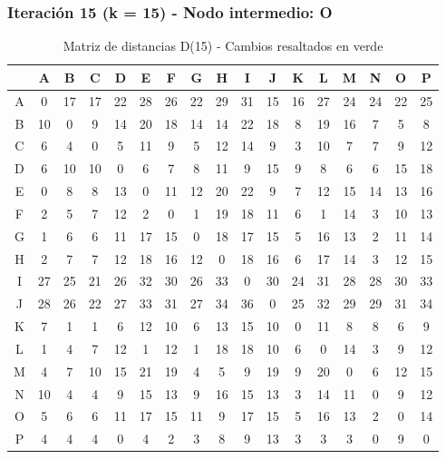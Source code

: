 \documentclass[12pt]{article}
\begin{document}
\subsubsection{Iteración 15 (k = 15) - Nodo intermedio: O}
\begin{table}[h!]
\centering
\begin{tabular}{|c|c|c|c|c|c|c|c|c|c|c|c|c|c|c|c|c|}
\hline
 & A & B & C & D & E & F & G & H & I & J & K & L & M & N & O & P \\\hline
A & 0 & 17 & 17 & 22 & 28 & 26 & 22 & 29 & 31 & 15 & 16 & 27 & 24 & 24 & 22 & 25 \\\hline
B & \cellcolor{lightgreen} 10 & 0 & 9 & 14 & 20 & 18 & 14 & \cellcolor{lightgreen} 14 & \cellcolor{lightgreen} 22 & 18 & 8 & 19 & 16 & \cellcolor{lightgreen} 7 & 5 & 8 \\\hline
C & 6 & 4 & 0 & 5 & 11 & 9 & 5 & 12 & 14 & 9 & 3 & 10 & 7 & 7 & 9 & 12 \\\hline
D & 6 & 10 & 10 & 0 & 6 & 7 & 8 & 11 & 9 & 15 & 9 & 8 & 6 & 6 & 15 & 18 \\\hline
E & 0 & 8 & 8 & 13 & 0 & 11 & 12 & 20 & 22 & 9 & 7 & 12 & 15 & 14 & 13 & 16 \\\hline
F & 2 & 5 & 7 & 12 & 2 & 0 & 1 & 19 & 18 & 11 & 6 & 1 & 14 & 3 & 10 & 13 \\\hline
G & 1 & 6 & 6 & 11 & 17 & 15 & 0 & 18 & 17 & 15 & 5 & 16 & 13 & 2 & 11 & 14 \\\hline
H & 2 & 7 & 7 & 12 & 18 & 16 & 12 & 0 & 18 & 16 & 6 & 17 & 14 & 3 & 12 & 15 \\\hline
I & 27 & 25 & 21 & 26 & 32 & 30 & 26 & 33 & 0 & 30 & 24 & 31 & 28 & 28 & 30 & 33 \\\hline
J & 28 & 26 & 22 & 27 & 33 & 31 & 27 & 34 & 36 & 0 & 25 & 32 & 29 & 29 & 31 & 34 \\\hline
K & 7 & 1 & 1 & 6 & 12 & 10 & 6 & 13 & 15 & 10 & 0 & 11 & 8 & 8 & 6 & 9 \\\hline
L & 1 & 4 & 7 & 12 & 1 & 12 & 1 & \cellcolor{lightgreen} 18 & 18 & 10 & 6 & 0 & 14 & 3 & 9 & 12 \\\hline
M & 4 & 7 & 10 & 15 & 21 & 19 & 4 & 5 & 9 & 19 & 9 & 20 & 0 & 6 & 12 & 15 \\\hline
N & 10 & 4 & 4 & 9 & 15 & 13 & 9 & 16 & 15 & 13 & 3 & 14 & 11 & 0 & 9 & 12 \\\hline
O & 5 & 6 & 6 & 11 & 17 & 15 & 11 & 9 & 17 & 15 & 5 & 16 & 13 & 2 & 0 & 14 \\\hline
P & 4 & 4 & 4 & 0 & 4 & 2 & 3 & 8 & 9 & 13 & 3 & 3 & 3 & 0 & 9 & 0 \\\hline
\end{tabular}
\caption{Matriz de distancias D(15) - Cambios resaltados en verde}
\end{table}
\end{document}
